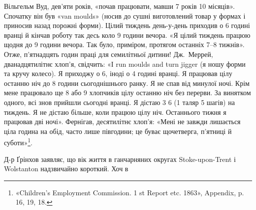 Вільгельм Вуд, дев’яти років, «почав працювати, мавши
7 років 10 місяців». Спочатку він був «van moulds» (носив до
сушні виготовлений товар у формах і приносив назад порожні
форми). Цілий тиждень день-у-день приходив о 6 годині вранці
й кінчав роботу так десь коло 9 години вечора. «Я цілий тиждень
працюю щодня до 9 години вечора. Так було, приміром, протягом
останніх 7--8 тижнів». Отже, п’ятнадцять годин праці для семилітньої
дитини! Дж.~Меррей, дванадцятилітнє хлоп’я, свідчить:
«І run moulds and turn jigger (я ношу форми та кручу колесо).
Я приходжу о 6, іноді о 4 годині вранці. Я працював цілу останню
ніч до 8 години сьогоднішнього ранку. Я не спав від минулої
ночі. Крім мене працювало ще 8 або 9 хлопчиків цілу останню
ніч без перерви. За винятком одного, всі знов прийшли сьогодні
вранці. Я дістаю 3 6 (1 таляр 5 шагів) на тиждень.
Я не дістаю більше, коли працюю цілу ніч. Останнього тижня
я працював дві ночі». Фернігав, десятилітнє хлоп’я: «Мені не
завжди лишається ціла година на обід, часто лише півгодини;
це буває щочетверга, п’ятниці й суботи»\footnote{«Children’s Employment Commission. 1 st Report etc. 1863», Appendix,
p. 16, 19, 18.
}.

Д-р Ґрінхов заявляє, що вік життя в ганчарняних округах
Stoke-upon-Trent і Wolstanton надзвичайно короткий. Хоч в
\parbreak{}  %
